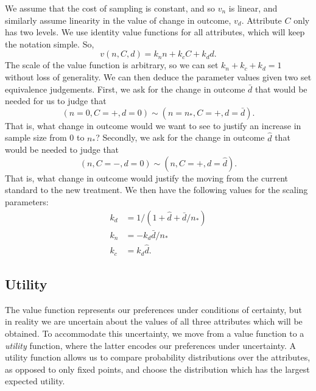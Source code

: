 \documentclass[sagev]{sagej}
\begin{document}
We assume that the cost of sampling is constant, and so $v_n$ is linear, and similarly assume linearity in the value of change in outcome, $v_d$. Attribute $C$ only has two levels. We use identity value functions for all attributes, which will keep the notation simple. So,
$$ 
v(n, C, d) = k_n n + k_c C + k_d d.
$$
The scale of the value function is arbitrary, so we can set $k_n + k_c + k_d = 1$ without loss of generality. We can then deduce the parameter values given two set equivalence judgements. First, we ask for the change in outcome $\bar{d}$ that would be needed for us to judge that
$$
(n = 0, C = +, d = 0) \sim (n = n_*, C = +, d = \bar{d}).
$$
That is, what change in outcome would we want to see to justify an increase in sample size from 0 to $n_*$? Secondly, we ask for the change in outcome $\hat{d}$ that would be needed to judge that
$$
(n, C = -, d = 0) \sim (n, C = +, d = \hat{d}).
$$
That is, what change in outcome would justify the moving from the current standard to the new treatment. We then have the following values for the scaling parameters:
\begin{align*}
k_d &= 1/(1 + \hat{d} + \bar{d}/n_*) \\
k_n &= -k_d \bar{d}/n_* \\
k_c &= k_d \hat{d}.
\end{align*}

\subsection{Utility}

The value function represents our preferences under conditions of certainty, but in reality we are uncertain about the values of all three attributes which will be obtained. To accommodate this uncertainty, we move from a value function to a \emph{utility} function, where the latter encodes our preferences under uncertainty. A utility function allows us to compare probability distributions over the attributes, as opposed to only fixed points, and choose the distribution which has the largest expected utility.
\end{document}

